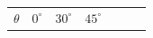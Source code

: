 {    %
    
        \begin{center}
      
      \label{m39414*id84073}
      
    \noindent
      \tablelasttail{}
      \begin{xtabular*}{\mytablewidth}[t]{|p{10\mystarwidth}|p{10\mystarwidth}|p{10\mystarwidth}|p{10\mystarwidth}|p{10\mystarwidth}|p{10\mystarwidth}|p{10\mystarwidth}|}\hline
    
    
        
                  \begin{math}\theta \end{math}
                 &
    
    
        
                  \begin{math}{0}^{\circ }\end{math}
                 &
    
    
        
                  \begin{math}{30}^{\circ }\end{math}
                 &
    
    
        
                  \begin{math}{45}^{\circ }\end{math}
                 &
    

\end{xtabular*}
\end{center}}
